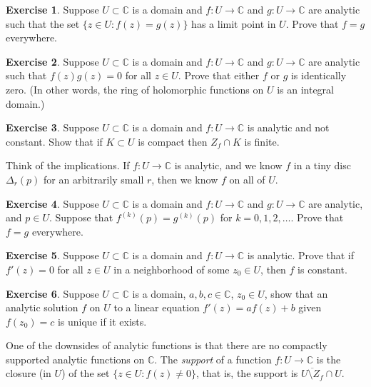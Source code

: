 \documentclass[12pt,openany]{book}
\newcommand{\C}{{\mathbb{C}}}
\newcommand{\myindex}[1]{#1\index{#1}}
\theoremstyle{plain}
\theoremstyle{remark}
\theoremstyle{definition}
\newenvironment{exbox}{%
    \def\FrameCommand{\vrule width 1pt \relax\hspace{10pt}}%
    \MakeFramed{\advance\hsize-\width\FrameRestore}%
}{%
    \endMakeFramed
}
\theoremstyle{exercise}
\newtheorem{exercise}{Exercise}[section]
\theoremstyle{example}
\begin{document}
\begin{exbox}
\begin{exercise}
Suppose $U \subset \C$ is a domain and $f \colon U \to \C$ and $g \colon U \to
\C$ are
analytic such that the set $\{ z \in U : f(z) = g(z) \}$ has a limit
point in $U$.  Prove that $f = g$ everywhere.
\end{exercise}

\begin{exercise}
Suppose $U \subset \C$ is a domain and $f \colon U \to \C$ and $g \colon U \to
\C$ are analytic such that $f(z)g(z) = 0$ for all $z \in U$.
Prove that either $f$ or $g$ is identically zero.
(In other words, the ring of holomorphic functions on $U$ is an integral
domain.)
\end{exercise}

\begin{exercise}
Suppose $U \subset \C$ is a domain and $f \colon U \to \C$ is
analytic and not constant.  Show that if $K \subset U$ is compact
then $Z_f \cap K$ is finite.
\end{exercise}
\end{exbox}

Think of the implications.  If $f \colon U \to \C$ is analytic, and we know
$f$ in a tiny disc $\Delta_r(p)$ for an arbitrarily small $r$, then
we know $f$ on all of $U$.

\begin{exbox}
\begin{exercise}
Suppose $U \subset \C$ is a domain and $f \colon U \to \C$ and $g \colon U \to
\C$ are analytic, and $p \in U$.  Suppose that $f^{(k)}(p) = g^{(k)}(p)$
for $k=0,1,2,\ldots$.  Prove that $f = g$ everywhere.
\end{exercise}

\begin{exercise}
Suppose $U \subset \C$ is a domain and $f \colon U \to \C$ is analytic.
Prove that if $f'(z) = 0$ for
all $z \in U$ in a neighborhood of some $z_0 \in U$, then $f$ is constant.
\end{exercise}

\begin{exercise}
Suppose $U \subset \C$ is a domain, $a, b, c \in \C$, $z_0 \in U$, show that
an analytic solution $f$ on $U$ to a linear equation $f'(z) = a f(z) + b$
given $f(z_0) = c$ is unique if it exists.
\end{exercise}
\end{exbox}

One of the downsides of analytic functions is that there are no compactly
supported analytic functions on $\C$.  The \emph{\myindex{support}}
of a function $f \colon U
\to \C$ is the closure (in $U$) of the set
$\bigl\{ z \in U : f(z) \not= 0 \bigr\}$, that is, 
the support is $\overline{U \setminus Z_f} \cap U$.
\end{document}
